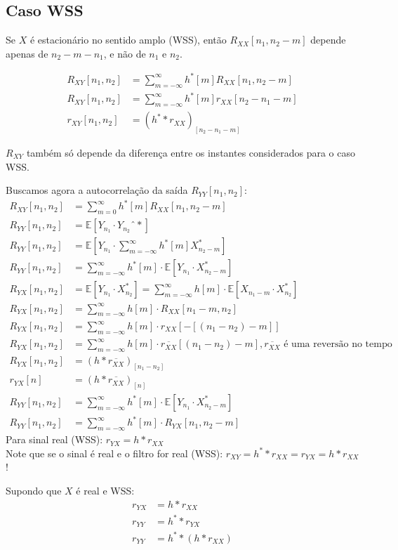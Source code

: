 \documentclass{article}
\begin{document}
\subsection{Caso WSS}
Se $X$ é estacionário no sentido amplo (WSS), então $R_{XX}[n_1, n_2-m]$ depende apenas de
$n_2-m-n_1$, e não de $n_1$ e $n_2$.

\begin{align*}
    R_{XY}[n_1,n_2] &=  \sum_{m=-\infty}^\infty h^*[m] R_{XX}[n_1,n_2-m] \\
    R_{XY}[n_1,n_2] &=  \sum_{m=-\infty}^\infty h^*[m] r_{XX}[n_2-n_1-m] \\
    r_{XY}[n_1,n_2] &=   (h^* * r_{XX})_{[n_2-n_1-m]}
\end{align*}

$R_{XY}$ também só depende da diferença entre os instantes considerados para o caso WSS.

Buscamos agora a autocorrelação da saída $R_{YY}[n_1,n_2]$:
\begin{align*}
    R_{XY}[n_1,n_2] &= \sum_{m=0}^\infty h^*[m] R_{XX}[n_1,n_2-m] \\
    R_{YY}[n_1,n_2] &= \mathbb{E}[Y_{n_1}\cdot Y_{n_2}ˆ*] \\
    R_{YY}[n_1,n_2] &= \mathbb{E}\left[Y_{n_1}\cdot \sum_{m=-\infty}^\infty h^*[m]X_{n_2-m}^*\right] \\
    R_{YY}[n_1,n_2] &= \sum_{m=-\infty}^\infty h^*[m] \cdot \mathbb{E}\left[Y_{n_1}\cdot X_{n_2-m}^*\right] \\
    R_{YX}[n_1,n_2] &= \mathbb{E}[Y_{n_1}\cdot X_{n_2}^*] = \sum_{m=-\infty}^\infty h[m]\cdot \mathbb{E}[X_{n_1-m} \cdot X_{n_2}^*] \\
    R_{YX}[n_1,n_2] &= \sum_{m=-\infty}^\infty h[m]\cdot R_{XX}[n_1-m,n_2] \\
    R_{YX}[n_1,n_2] &= \sum_{m=-\infty}^\infty h[m]\cdot r_{XX}[-[(n_1-n_2)-m]] \\
    R_{YX}[n_1,n_2] &= \sum_{m=-\infty}^\infty h[m]\cdot \overline{r_{XX}}[(n_1-n_2)-m], \overline{r_{XX}} \text{ é uma reversão no tempo} \\
    R_{YX}[n_1,n_2] &= (h * \overline{r_{XX}})_{[n_1-n_2]} \\
    r_{YX}[n] &= (h * \overline{r_{XX}})_{[n]} \\
    R_{YY}[n_1,n_2] &= \sum_{m=-\infty}^\infty h^*[m] \cdot \mathbb{E}\left[Y_{n_1}\cdot X_{n_2-m}^*\right] \\
    R_{YY}[n_1,n_2] &= \sum_{m=-\infty}^\infty h^*[m] \cdot R_{YX}[n_1,n_2-m]
\end{align*}
Para sinal real (WSS): $r_{YX} = h * r_{XX}$
\\
Note que se o sinal é real e o filtro for real (WSS): $r_{XY} = h^* * r_{XX} = r_{YX} = h * r_{XX}$!

Supondo que $X$ é real e WSS:
\begin{align*}
    r_{YX} &= h * r_{XX} \\
    r_{YY} &= h^* * r_{YX} \\
    r_{YY} &= h^* * (h * r_{XX})
\end{align*}
\end{document}
